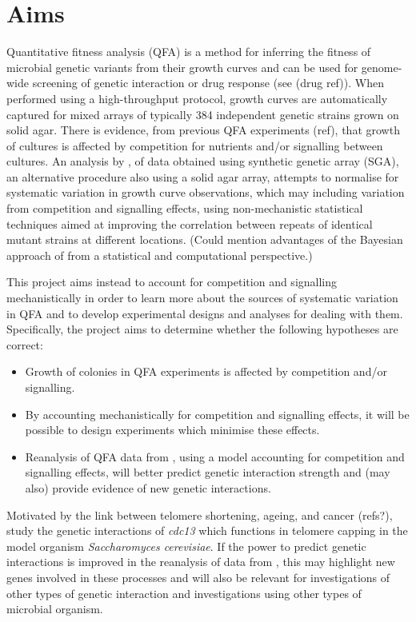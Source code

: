 
\section{Aims}
\label{sec:aims}


Quantitative fitness analysis (QFA) is a method for inferring the
fitness of microbial genetic variants from their growth curves and can be
used for genome-wide screening of genetic interaction or drug response
(see \citet{Addinall2008,Addinall2011,Lawless2010,Banks2012} (drug
ref)). When performed using a high-throughput protocol, growth curves are
automatically captured for mixed arrays of typically 384 independent
genetic strains grown on solid agar. There is evidence, from previous
QFA experiments (ref), that growth of cultures is affected by
competition for nutrients and/or signalling between cultures.
An analysis by \citet{Baryshnikova2010}, of data obtained using synthetic
genetic array (SGA), an alternative procedure also using a solid
agar array, attempts to normalise for systematic variation in growth
curve observations, which may including variation from competition and
signalling effects, using non-mechanistic statistical techniques aimed
at improving the correlation between repeats of identical mutant
strains at different locations. (Could mention advantages
of the Bayesian approach of \citet{Heydari2016} from a statistical and
computational perspective.)

This project aims instead to account for competition and signalling
mechanistically in order to learn more about the sources of systematic
variation in QFA and to develop experimental designs and analyses for
dealing with them. Specifically, the project aims to determine whether
the following hypotheses are correct:
\begin{itemize}
\item Growth of colonies in QFA experiments is affected by competition
  and/or signalling.
\item By accounting mechanistically for competition and signalling effects, it
  will be possible to design experiments which minimise these effects.
\item Reanalysis of QFA data from \citet{Addinall2011}, using a model accounting for
  competition and signalling effects, will better predict genetic interaction
  strength and (may also) provide evidence of new genetic interactions.
\end{itemize}


Motivated by the link between telomere shortening, ageing, and cancer
(refs?), \citet{Addinall2011} study the genetic interactions of
\textit{cdc13} which functions in telomere capping in the model
organism \textit{Saccharomyces cerevisiae}. If the power to predict
genetic interactions is improved in the reanalysis of data from
\citet{Addinall2011}, this may highlight new genes involved in these
processes and will also be relevant for investigations of other types
of genetic interaction and investigations using other types of
microbial organism.



